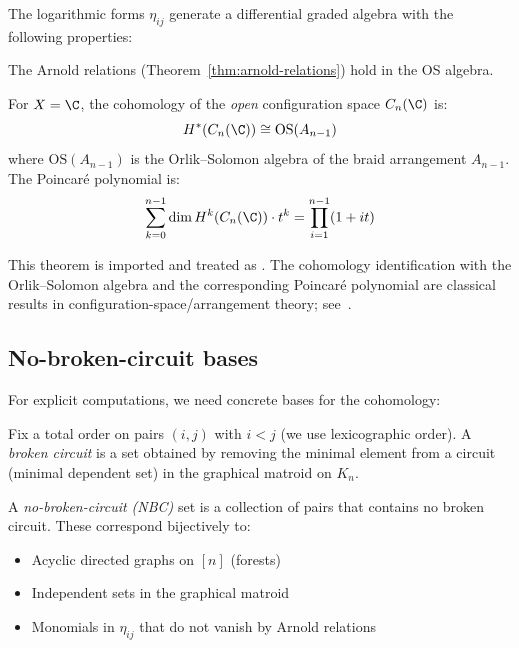 The logarithmic forms $\eta_{ij}$ generate a differential graded algebra with the following properties:

The Arnold relations (Theorem~\ref{thm:arnold-relations}) hold in the OS algebra.
 
\begin{theorem}\label{thm:os-cohomology-config}
For $X = \C$, the cohomology of the \emph{open} configuration space $C_n(\C)$ is:
\[
H^*(C_n(\C)) \cong \text{OS}(A_{n-1})
\]
where $\text{OS}(A_{n-1})$ is the Orlik--Solomon algebra of the braid arrangement $A_{n-1}$. The Poincaré polynomial is:
\[
\sum_{k=0}^{n-1} \dim H^k(C_n(\C)) \cdot t^k = \prod_{i=1}^{n-1}(1 + it)
\]
\end{theorem}

\begin{remark}
This theorem is imported and treated as \ClaimStatusProvedElsewhere. The
cohomology identification with the Orlik--Solomon algebra and the corresponding
Poincar\'e polynomial are classical results in configuration-space/arrangement
theory; see~\cite{Arnold69,OS80}.
\end{remark}
 
\subsection{No-broken-circuit bases}
 
For explicit computations, we need concrete bases for the cohomology:
 
\begin{definition}
Fix a total order on pairs $(i, j)$ with $i < j$ (we use lexicographic order). A \emph{broken circuit} is a set obtained by removing the minimal element from a circuit (minimal dependent set) in the graphical matroid on $K_n$.
\end{definition}
 
\begin{definition}
A \emph{no-broken-circuit (NBC)} set is a collection of pairs that contains no broken circuit. These correspond bijectively to:
\begin{itemize}
\item Acyclic directed graphs on $[n]$ (forests)
\item Independent sets in the graphical matroid
\item Monomials in $\eta_{ij}$ that do not vanish by Arnold relations
\end{itemize}
\end{definition}
 

